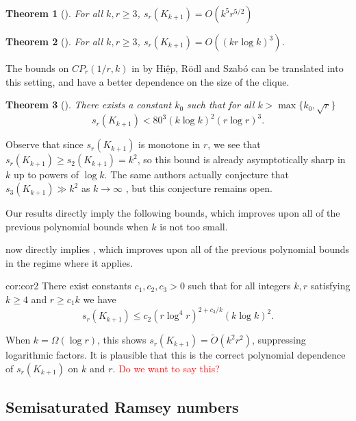 \documentclass[12pt]{article}
\newcommand{\red}[1]{\textcolor{red}{#1}}
\newtheorem{theorem}{Theorem}
\theoremstyle{definition}
\begin{document}
	\begin{theorem}[\cite{bamberg2022minimum}]
		For all $k,r \geq 3$, $s_r(K_{k+1}) = O(k^5r^{5/2})$
	\end{theorem}
	
	\begin{theorem}[\cite{bishnoi2022new}]
		For all $k,r \geq 3$, $s_r(K_{k+1}) = O((kr\log k)^3)$.
	\end{theorem}
	
	The bounds on $CP_r(1/r,k)$ in  by Hiệp, R\"odl and Szab\'o \cite{han} can be translated into this setting, and have a better dependence on the size of the clique.
	
	\begin{theorem}[\cite{han}]
		There exists a constant $k_0$ such that for all $k > \max\{k_0,\sqrt{r}\}$
		\[s_r(K_{k+1}) < 80^3(k\log k)^2(r\log r)^3.\]
	\end{theorem}
	
	Observe that since $s_r(K_{k+1})$ is monotone in $r$, we see that $s_r(K_{k+1}) \geq s_2(K_{k+1}) = k^2$, so this bound is already asymptotically sharp in $k$ up to powers of $\log k$. The same authors actually conjecture that $s_3(K_{k+1}) \gg k^2$ as $k \to \infty$ \cite[Conjecture 2]{han}, but this conjecture remains open. 
	
	Our results directly imply the following bounds, which improves upon all of the previous polynomial bounds when $k$ is not too small.
	
	 now directly implies , which improves upon all of the previous polynomial bounds in the regime where it applies.
	
	\begin{repcorollary}{cor:cor2}
		There exist constants $c_1,c_2,c_3 > 0$ such that for all integers $k,r$ satisfying $k \geq 4$ and $r \geq c_1k$ we have 
		\[s_r(K_{k+1}) \leq c_2 (r\log^4 r)^{2+c_3/k}(k\log k)^2.\]
	\end{repcorollary}
	
	When $k = \Omega(\log r)$, this shows $s_r(K_{k+1}) = \widetilde{O}(k^2r^2)$, suppressing logarithmic factors. It is plausible that this is the correct polynomial dependence of $s_r(K_{k+1})$ on $k$ and $r$. \red{Do we want to say this?}
	
	\subsection{Semisaturated Ramsey numbers} \label{subsec:saturated}
	
\end{document}
